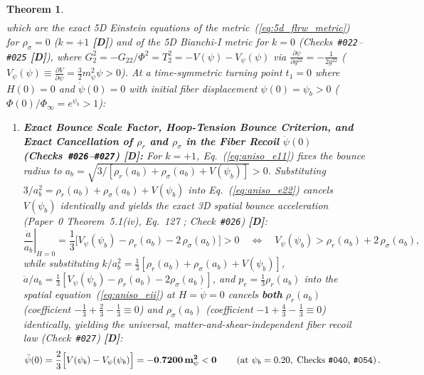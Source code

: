 \documentclass[11pt,a4paper]{article}
\newcommand{\catD}{\textbf{\textcolor{blue!75!black}{[D]}}}
\theoremstyle{plain}
\newtheorem{theorem}{Theorem}[section]
\theoremstyle{definition}
\theoremstyle{remark}
\numberwithin{equation}{section}
\begin{document}
\begin{theorem}
\begin{subequations}
\begin{align}
\end{align}
\end{subequations}
which are the exact 5D Einstein equations of the metric~(\ref{eq:5d_flrw_metric}) for $\rho_{\sigma} = 0$ ($k = +1$ \catD) and of the 5D Bianchi-I metric for $k = 0$ (Checks~\texttt{\#022}--\texttt{\#025} \catD), where $G^2_2 = -G_{22}/\Phi^2 = T^2_2 = -V(\psi) - V_{\psi}(\psi)$ via $\frac{\partial\psi}{\partial g^{22}} = -\frac{1}{2g^{22}}$ ($V_{\psi}(\psi) \equiv \frac{\partial V}{\partial\psi} = \frac{3}{2}m_{\psi}^2\psi > 0$). At a time-symmetric turning point $t_1 = 0$ where $H(0) = 0$ and $\dot{\psi}(0) = 0$ with initial fiber displacement $\psi(0) = \psi_b > 0$ ($\Phi(0)/\Phi_{\infty} = e^{\psi_b} > 1$):
\begin{enumerate}
  \item[\textnormal{(i)}] \textbf{Exact Bounce Scale Factor, Hoop-Tension Bounce Criterion, and Exact Cancellation of $\rho_r$ and $\rho_{\sigma}$ in the Fiber Recoil $\ddot{\psi}(0)$ (Checks~\texttt{\#026}--\texttt{\#027}) \catD:} For $k = +1$, Eq.~(\ref{eq:aniso_e11}) fixes the bounce radius to $a_b = \sqrt{3 / [\rho_r(a_b) + \rho_{\sigma}(a_b) + V(\psi_b)]} > 0$. Substituting $3/a_b^2 = \rho_r(a_b) + \rho_{\sigma}(a_b) + V(\psi_b)$ into Eq.~(\ref{eq:aniso_e22}) cancels $V(\psi_b)$ identically and yields the exact 3D spatial bounce acceleration (\textit{Paper~0} Theorem~5.1(iv), Eq.~127 \cite{jimenez2026_p0}; Check~\texttt{\#026}) \catD:
  \begin{equation}
    \left.\frac{\ddot{a}}{a_b}\right|_{H=0} = \frac{1}{3}\Big[V_{\psi}(\psi_b) - \rho_r(a_b) - 2\,\rho_{\sigma}(a_b)\Big] > 0 \quad \Longleftrightarrow \quad \boxed{V_{\psi}(\psi_b) > \rho_r(a_b) + 2\,\rho_{\sigma}(a_b),}
    \label{eq:exact_anisotropic_bounce_condition}
  \end{equation}
  while substituting $k/a_b^2 = \frac{1}{3}[\rho_r(a_b) + \rho_{\sigma}(a_b) + V(\psi_b)]$, $\ddot{a}/a_b = \frac{1}{3}[V_{\psi}(\psi_b) - \rho_r(a_b) - 2\rho_{\sigma}(a_b)]$, and $p_r = \frac{1}{3}\rho_r(a_b)$ into the spatial equation~(\ref{eq:aniso_eii}) at $H = \dot{\psi} = 0$ cancels \textbf{both} $\rho_r(a_b)$ (coefficient $-\frac{1}{3} + \frac{2}{3} - \frac{1}{3} \equiv 0$) and $\rho_{\sigma}(a_b)$ (coefficient $-1 + \frac{4}{3} - \frac{1}{3} \equiv 0$) identically, yielding the universal, matter-and-shear-independent fiber recoil law (Check~\texttt{\#027}) \catD:
  \begin{equation}
    \ddot{\psi}(0) = \frac{2}{3}\Big[V(\psi_b) - V_{\psi}(\psi_b)\Big] = \mathbf{-0.7200\,m_{\psi}^2 < 0} \qquad \left(\text{at }\psi_b = 0.20, \;\text{Checks~\texttt{\#040}, \texttt{\#054}}\right).

\end{equation}
\end{enumerate}
\end{theorem}
\end{document}
